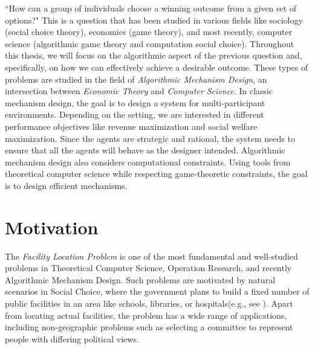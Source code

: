 ``How can a group of individuals choose a winning outcome from a given set of options?" This is a question that has been studied in various fields like sociology (social choice theory), economics (game theory), and most recently, computer science (algorithmic game theory and computation social choice). Throughout this thesis, we will focus on the algorithmic aspect of the previous question and, specifically, on how we can effectively achieve a desirable outcome. These types of problems are studied in the field of \textit{Algorithmic Mechanism Design}, an intersection between \textit{Economic Theory} and \textit{Computer Science}. In classic mechanism design, the goal is to design a system for multi-participant environments. Depending on the setting, we are interested in different performance objectives like revenue maximization and social welfare maximization. Since the agents are strategic and rational, the system needs to ensure that all the agents will behave as the designer intended. Algorithmic mechanism design also considers computational constraints. Using tools from theoretical computer science while respecting game-theoretic constraints, the goal is to design efficient mechanisms.






\section{Motivation}

The \emph{Facility Location Problem} is one of the most fundamental and well-studied problems in Theoretical Computer Science, Operation Research, and recently Algorithmic Mechanism Design. Such problems are motivated by natural scenarios in Social Choice, where the government plans to build a fixed number of public facilities in an area like schools, libraries, or hospitals(e.g., see \cite{Miyagawa}). Apart from locating actual facilities, the problem has a wide range of applications, including non-geographic problems such as selecting a committee to represent people with differing political views. 


